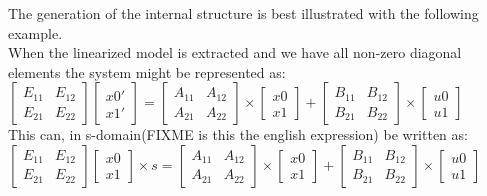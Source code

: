 \documentclass{report}
\begin{document}
The generation of the internal structure is best illustrated with the following example.\\\newline
When the linearized model is extracted and we have all non-zero diagonal elements the system might be represented as:\\\newline
$
\begin{bmatrix} E_{11} & E_{12} \\ E_{21} & E_{22} \end{bmatrix} \left[ \begin{array}{c} x0' \\ x1' \end{array} \right]
= \begin{bmatrix} A_{11} & A_{12} \\ A_{21} & A_{22} \end{bmatrix} \times \left[ \begin{array}{c} x0 \\ x1 \end{array} \right] + \begin{bmatrix} B_{11} & B_{12} \\ B_{21} & B_{22} \end{bmatrix} \times \left[ \begin{array}{c} u0 \\ u1 \end{array} \right]$\\\newline
This can, in s-domain(FIXME is this the english expression) be written as:\\\newline
$
\begin{bmatrix} E_{11} & E_{12} \\ E_{21} & E_{22} \end{bmatrix}  \left[ \begin{array}{c} x0 \\ x1 \end{array} \right] \times s
= \begin{bmatrix} A_{11} & A_{12} \\ A_{21} & A_{22} \end{bmatrix} \times \left[ \begin{array}{c} x0 \\ x1 \end{array} \right] + \begin{bmatrix} B_{11} & B_{12} \\ B_{21} & B_{22} \end{bmatrix} \times \left[ \begin{array}{c} u0 \\ u1 \end{array} \right]$\\\newline
\end{document}
